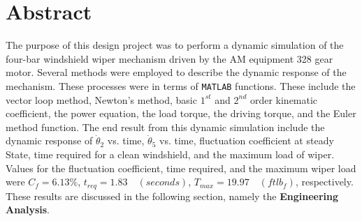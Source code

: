 \documentclass[12pt]{article}
\begin{document}

\newpage
\section*{Abstract}
\begin{doublespace}
The purpose of this design project was to perform a dynamic simulation of the four-bar windshield wiper mechanism driven by the AM equipment 328 gear motor. Several methods were employed to describe the dynamic response of the mechanism. These processes were in terms of {\tt MATLAB} functions. These include the vector loop method, Newton's method, basic $1^{st}$ and $2^{nd}$ order kinematic coefficient, the power equation, the load torque, the driving torque, and the Euler method function. The end result from this dynamic simulation include the dynamic response of $\dot{\theta}_{2}$ vs. time, $\dot{\theta}_{5}$ vs. time, fluctuation coefficient at steady State, time required for a clean windshield, and the maximum load of wiper. Values for the fluctuation coefficient, time required, and the maximum wiper load were $C_{f} = 6.13 \%$, $t_{req} = 1.83 \quad (seconds)$, $T_{max} = 19.97 \quad (ft lb_{f})$, respectively. These results are discussed in the following section, namely the {\bf Engineering Analysis}.
\end{doublespace}
\end{document}
